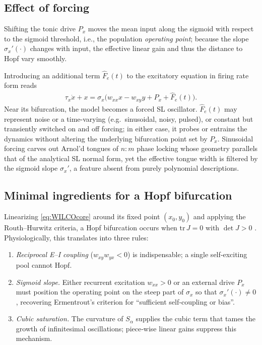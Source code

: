 \documentclass[12pt]{article}
\numberwithin{equation}{section}
\begin{document}
\subsection{Effect of forcing}

Shifting the tonic drive \(P_x\) moves the mean input along the sigmoid with respect to the sigmoid threshold, i.e., the population \textit{operating point}; because the slope \(\sigma_x'(\cdot)\) changes with input, the effective linear gain and thus the distance to Hopf vary smoothly.\cite{breakspear_dynamic_2017}

Introducing an additional term \(\hat F_e(t)\) to the excitatory equation in firing rate form reads
\begin{align}
\tau_x\dot{x}+x = \sigma_x\!\bigl(w_{xx}x - w_{xy}y + P_x + \hat F_e(t)\bigr).
  \label{eq:WILCOforcing}
\end{align}
Near its bifurcation, the model becomes a forced SL oscillator\cite{fredrickson-hemsingModelockingDynamicsHair2012}.  
\(\hat F_e(t)\) may represent noise or a time-varying (e.g.\ sinusoidal, noisy, pulsed), or constant but transiently switched on and off forcing; in either case, it probes or entrains the dynamics without altering the underlying bifurcation point set by \(P_x\). Sinusoidal forcing carves out Arnol'd tongues of \(n{:}m\) phase locking whose geometry parallels that of the analytical SL normal form, yet the effective tongue width is filtered by the sigmoid slope \(\sigma_x'\), a feature absent from purely polynomial descriptions.

\subsection{Minimal ingredients for a Hopf bifurcation}

Linearizing \eqref{eq:WILCOcore} around its fixed point \((x_0,y_0)\) and applying the Routh–Hurwitz criteria, a Hopf bifurcation occurs when \(\text{tr}\,J=0\) with \(\det J>0\) \cite{guckenheimerNonlinearOscillationsDynamical2002}.
Physiologically, this translates into three rules:

\begin{enumerate}
  \item \emph{Reciprocal E–I coupling} (\(w_{xy}w_{yx}<0\)) is indispensable; a single self‑exciting pool cannot Hopf.
  \item \emph{Sigmoid slope.} Either recurrent excitation \(w_{xx}>0\) or an external drive \(P_x\) must position the operating point on the steep part of \(\sigma_x\) so that \(\sigma_x'(\cdot)\neq0\), recovering Ermentrout’s criterion for “sufficient self‑coupling or bias”.\cite{Ermentrout:2010aa}
  \item \emph{Cubic saturation.} The curvature of \(S_{\alpha}\) supplies the cubic term that tames the growth of infinitesimal oscillations; piece‑wise linear gains suppress this mechanism.
\end{enumerate}
\end{document}
